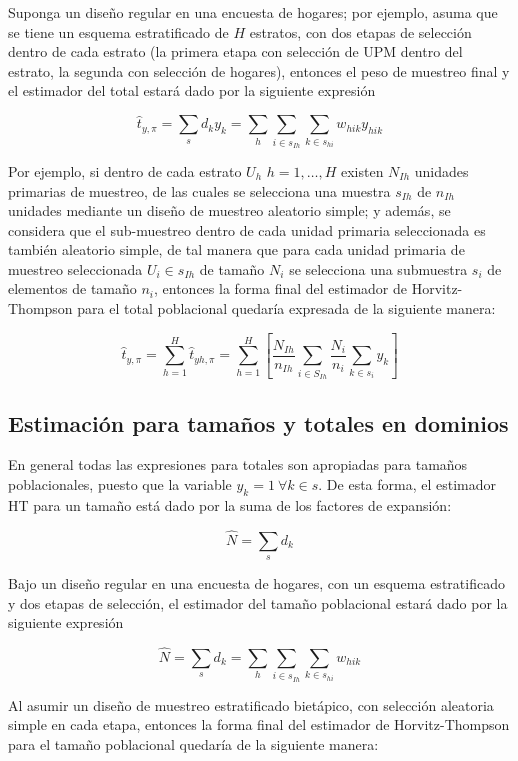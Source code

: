 \documentclass[
  12pt,
  spanish,
]{book}
\begin{document}
Suponga un diseño regular en una encuesta de hogares; por ejemplo, asuma que se tiene un esquema estratificado de \(H\) estratos, con dos etapas de selección dentro de cada estrato (la primera etapa con selección de UPM dentro del estrato, la segunda con selección de hogares), entonces el peso de muestreo final y el estimador del total estará dado por la siguiente expresión

\[
\hat{t}_{y, \pi} = \sum_s d_k y_k = \sum_h \sum_{i \in s_{Ih}} \sum_{k \in s_{hi}}  w_{hik} y_{hik}
\]

Por ejemplo, si dentro de cada estrato \(U_h\) \(h=1,\ldots, H\) existen \(N_{Ih}\) unidades primarias de muestreo, de las cuales se selecciona una muestra \(s_{Ih}\) de \(n_{Ih}\) unidades mediante un diseño de muestreo aleatorio simple; y además, se considera que el sub-muestreo dentro de cada unidad primaria seleccionada es también aleatorio simple, de tal manera que para cada unidad primaria de muestreo seleccionada \(U_i\in s_{Ih}\) de tamaño \(N_i\) se selecciona una submuestra \(s_i\) de elementos de tamaño \(n_i\), entonces la forma final del estimador de Horvitz-Thompson para el total poblacional quedaría expresada de la siguiente manera:

\[
\hat{t}_{y,\pi}=\sum_{h=1}^H\hat{t}_{yh,\pi}=\sum_{h=1}^H\left[\frac{N_{Ih}}{n_{Ih}}\sum_{i\in S_{Ih}}\frac{N_i}{n_i}\sum_{k\in s_i}y_k\right]
\]

\hypertarget{estimaciuxf3n-para-tamauxf1os-y-totales-en-dominios}{%
\subsection{Estimación para tamaños y totales en dominios}\label{estimaciuxf3n-para-tamauxf1os-y-totales-en-dominios}}

En general todas las expresiones para totales son apropiadas para tamaños poblacionales, puesto que la variable \(y_k = 1 \ \forall k \in s\). De esta forma, el estimador HT para un tamaño está dado por la suma de los factores de expansión:

\[
\hat{N} = \sum_s d_k 
\]

Bajo un diseño regular en una encuesta de hogares, con un esquema estratificado y dos etapas de selección, el estimador del tamaño poblacional estará dado por la siguiente expresión

\[
\hat{N} = \sum_s d_k = \sum_h \sum_{i \in s_{Ih}} \sum_{k \in s_{hi}}  w_{hik} 
\]

Al asumir un diseño de muestreo estratificado bietápico, con selección aleatoria simple en cada etapa, entonces la forma final del estimador de Horvitz-Thompson para el tamaño poblacional quedaría de la siguiente manera:
\end{document}
